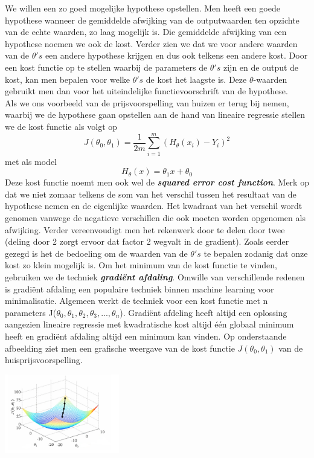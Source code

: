 We willen een zo goed mogelijke hypothese opstellen. Men heeft een goede hypothese wanneer de gemiddelde afwijking van de outputwaarden ten opzichte van de echte waarden, zo laag mogelijk is. Die gemiddelde afwijking van een hypothese noemen we ook de kost. Verder zien we dat we voor andere waarden van de $\theta's$ een andere hypothese krijgen en dus ook telkens een andere kost. Door een kost functie op te stellen waarbij de parameters de $\theta's$ zijn en de output de kost, kan men bepalen voor welke $\theta's$ de kost het laagste is. Deze $\theta$-waarden gebruikt men dan voor het uiteindelijke functievoorschrift van de hypothese. \\
Als we ons voorbeeld van de prijsvoorspelling van huizen er terug bij nemen, waarbij we de hypothese gaan opstellen aan de hand van lineaire regressie stellen we de kost functie als volgt op\\
\[J(\theta_{0},\theta_{1}) = \frac{1}{2m}\sum_{i=1}^{m} (H_{\theta}(x_i) - Y_i )^2\]
met als model 
\[H_{\theta}(x) = \theta_{1}x + \theta_{0}\]
%
Deze kost functie noemt men ook wel de \textbf{\textit{squared error cost function}}. Merk op dat we niet zomaar telkens de som van het verschil tussen het resultaat van de hypothese nemen en de eigenlijke waarden. Het kwadraat van het verschil wordt genomen vanwege de negatieve verschillen die ook moeten worden opgenomen als afwijking. Verder vereenvoudigt men het rekenwerk door te delen door twee (deling door 2 zorgt ervoor dat factor 2 wegvalt in de gradient). 
\newline
Zoals eerder gezegd is het de bedoeling om de waarden van de $\theta's$ te bepalen zodanig dat onze kost zo klein mogelijk is. Om het minimum van de kost functie te vinden, gebruiken we de techniek \textbf{\textit{gradi\"ent afdaling}}. Omwille van verschillende redenen is gradi\"ent afdaling een populaire techniek binnen machine learning voor minimalisatie. Algemeen werkt de techniek voor een kost functie met n parameters J($\theta_{0},\theta_{1},\theta_{2},\theta_{3}, ... ,\theta_{n}$). Gradi\"ent afdeling heeft altijd een oplossing aangezien lineaire regressie met kwadratische kost altijd \'e\'en globaal minimum heeft en gradi\"ent afdaling altijd een minimum kan vinden.
Op onderstaande afbeelding ziet men een grafische weergave van de kost functie $J(\theta_{0},\theta_{1})$ van de huisprijsvoorspelling.
\newline
\begin{center}
  \includegraphics[width=5cm]{3d_plot_1}
\end{center}
